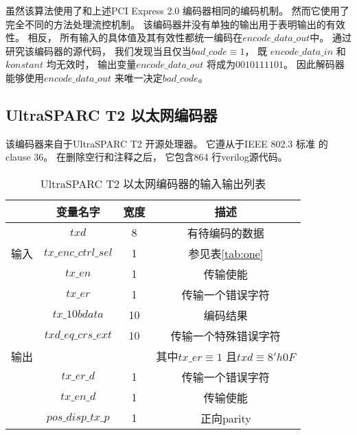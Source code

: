 虽然该算法使用了和上述PCI Express 2.0 编码器相同的编码机制。
然而它使用了完全不同的方法处理流控机制。
该编码器并没有单独的输出用于表明输出的有效性。
相反，
所有输入的具体值及其有效性都统一编码在$encode\_data\_out$中。
通过研究该编码器的源代码，
我们发现当且仅当$bad\_code\equiv 1$，
既
$encode\_data\_in$ 和$konstant$ 均无效时，
输出变量$encode\_data\_out$ 将成为$0010111101$。
因此解码器能够使用$encode\_data\_out$ 来唯一决定$bad\_code$。



\subsection{UltraSPARC T2 以太网编码器}\label{subsec_t2e}
该编码器来自于UltraSPARC T2 开源处理器。
它遵从于IEEE 802.3 标准 的clause 36。
在删除空行和注释之后，
它包含864 行verilog源代码。


\begin{table}[b]%
\caption{UltraSPARC T2 以太网编码器的输入输出列表}
\label{tab:t2eth}
\centering
\begin{tabular}{|c|c|c|c|}
\hline
         & 变量名字             & 宽度  & 描述\\\hline\hline
         & $txd$                & 8     &有待编码的数据\\\cline{2-4}
输入     & $tx\_enc\_ctrl\_sel$ & 1     &参见表\ref{tab:one} \\\cline{2-4}
         & $tx\_en$             & 1     &传输使能\\\cline{2-4}
         & $tx\_er$             & 1     &传输一个错误字符\\\hline
         & $tx\_10bdata$        & 10    &编码结果 \\\cline{2-4}
         & $txd\_eq\_crs\_ext$  & 10    &传输一个特殊错误字符\\
输出     &                      &       &其中$tx\_er\equiv 1$ 且$txd\equiv 8'h0F$ \\\cline{2-4}
         & $tx\_er\_d$          & 1     &传输一个错误字符\\\cline{2-4}
         & $tx\_en\_d$          & 1     &传输使能\\\cline{2-4}
         & $pos\_disp\_tx\_p$   & 1     &正向parity\\\hline
\end{tabular}
\end{table}%

